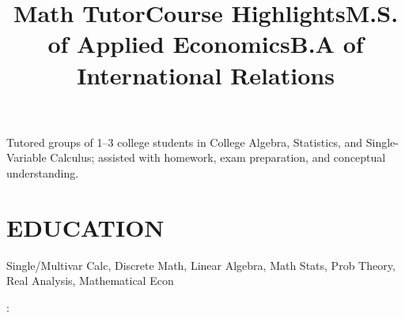 \documentclass[resmargin, centered, 10pt]{../res}
\begin{document}
\begin{resume}
\title{Math Tutor}
\begin{position}
Tutored groups of 1--3 college students in College Algebra, Statistics, and Single-Variable Calculus; assisted with homework, exam preparation, and conceptual understanding.
\end{position}

\fullline

\section{EDUCATION}

\title{Course Highlights}
\employer{}
\dates{}
\location{}
\begin{position}
Single/Multivar Calc, Discrete Math, Linear Algebra, Math Stats, Prob Theory, Real Analysis, Mathematical Econ
\end{position}

\title{M.S. of Applied Economics}
\begin{position}
	: 
\end{position}

\title{B.A of International Relations}
\begin{position}
\end{position}

\end{resume}
\end{document}
